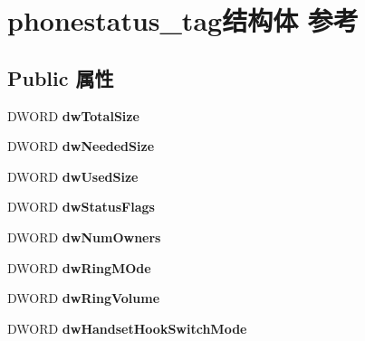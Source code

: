 \hypertarget{structphonestatus__tag}{}\section{phonestatus\+\_\+tag结构体 参考}
\label{structphonestatus__tag}
\subsection*{Public 属性}
\begin{DoxyCompactItemize}
\item 
\mbox{\label{structphonestatus__tag_ae2adf0fa411c3ce95b120ea62615ecdd}} 
D\+W\+O\+RD {\bfseries dw\+Total\+Size}
\item 
\mbox{\label{structphonestatus__tag_a43daabf8b4dc2582d5b965111a42a043}} 
D\+W\+O\+RD {\bfseries dw\+Needed\+Size}
\item 
\mbox{\label{structphonestatus__tag_ab3827afd7cdb4798c51a65a833f9e6bb}} 
D\+W\+O\+RD {\bfseries dw\+Used\+Size}
\item 
\mbox{\label{structphonestatus__tag_a2106966b4effc7f9084f1788fcdf8c6e}} 
D\+W\+O\+RD {\bfseries dw\+Status\+Flags}
\item 
\mbox{\label{structphonestatus__tag_a8064515cd5ab87750f82222de62b60d8}} 
D\+W\+O\+RD {\bfseries dw\+Num\+Owners}
\item 
\mbox{\label{structphonestatus__tag_a5ffbd0c74e8c60441786b6993e293c4e}} 
D\+W\+O\+RD {\bfseries dw\+Ring\+M\+Ode}
\item 
\mbox{\label{structphonestatus__tag_a5f8956de4b66d0942c22a6345e305ca7}} 
D\+W\+O\+RD {\bfseries dw\+Ring\+Volume}
\item 
\mbox{\label{structphonestatus__tag_abfb61e626c0081e1763684d62b0e21e7}} 
D\+W\+O\+RD {\bfseries dw\+Handset\+Hook\+Switch\+Mode}
\item 
\mbox{\label{structphonestatus__tag_aeb943c1c0de2fa41e8449adf47984f98}} 

\end{DoxyCompactItemize}
